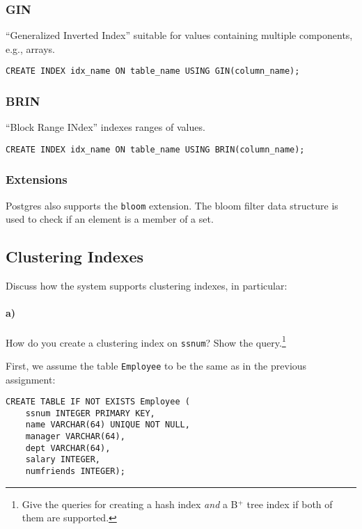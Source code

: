 \documentclass[11pt]{scrartcl}
\begin{document}
\subsubsection*{GIN \cite{PostgreSQL2024IndexTypes} \cite{PostgreSQL2024GistGin}}
\enquote{Generalized Inverted Index} suitable for values containing multiple components, e.g., arrays.
\begin{lstlisting}[style=dbtsql]
CREATE INDEX idx_name ON table_name USING GIN(column_name);
\end{lstlisting}

\subsubsection*{BRIN \cite{PostgreSQL2024IndexTypes}}
\enquote{Block Range INdex} indexes ranges of values.
\begin{lstlisting}[style=dbtsql]
CREATE INDEX idx_name ON table_name USING BRIN(column_name);
\end{lstlisting}

\subsubsection*{Extensions \cite{PostgreSQL2024Bloom}}
Postgres also supports the \texttt{bloom} extension.
The bloom filter data structure is used to check if an element is a member of a set.

\subsection{Clustering Indexes}

Discuss how the system supports clustering indexes, in particular:

\paragraph{a)}

How do you create a clustering index on \texttt{ssnum}? Show the query.\footnote{Give the queries for creating a hash index \emph{and} a B$^+$ tree index if both of them are supported.}

First, we assume the table \texttt{Employee} to be the same as in the previous assignment:
\begin{lstlisting}[style=dbtsql]
CREATE TABLE IF NOT EXISTS Employee (
    ssnum INTEGER PRIMARY KEY,
    name VARCHAR(64) UNIQUE NOT NULL,
    manager VARCHAR(64),
    dept VARCHAR(64),
    salary INTEGER,
    numfriends INTEGER);
\end{lstlisting}
\end{document}
